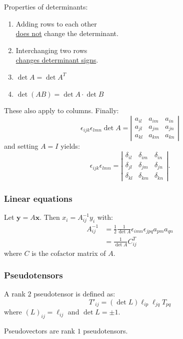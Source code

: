 \documentclass{article}
\begin{document}
\begin{multicols*}{3}
Properties of determinants:
\begin{enumerate}
    \item Adding rows to each other \\
    \underline{does not} change the determinant.
    
    \item Interchanging two rows \\
    \underline{changes determinant signs}.

    \item $\det A=\det A^T$
    
    \item $\det(AB)=\det A\cdot\det B$
\end{enumerate}
These also apply to columns. Finally:
$$\epsilon_{ijk}\epsilon_{lmn}\det A
=\left|
    \begin{array}{lll}
        a_{il} & a_{im} & a_{in} \\
        a_{jl} & a_{jm} & a_{jn} \\
        a_{kl} & a_{km} & a_{kn}
    \end{array}
\right|$$
and setting $A=I$ yields:
$$\epsilon_{ijk}\epsilon_{lmn}
=\left|
    \begin{array}{lll}
        \delta_{il} & \delta_{im} & \delta_{in} \\
        \delta_{jl} & \delta_{jm} & \delta_{jn} \\
        \delta_{kl} & \delta_{km} & \delta_{kn}
    \end{array}
\right|.$$

\subsubsection*{Linear equations}
Let $\boldsymbol{y}=A\boldsymbol{x}$.
Then $x_i=A^{-1}_{ij}y_i$ with:
\begin{align*}
    A^{-1}_{ij}&=\frac{1}{2}\frac{1}{\det A}
    \epsilon_{imn}\epsilon_{jpq}a_{pm}a_{qn} \\
    &=\frac{1}{\det A}C_{ij}^T
\end{align*}
where $C$ is the cofactor matrix of $A$.

\subsubsection*{Pseudotensors}
A rank $2$ pseudotensor is defined as:
$$T'_{ij}=(\det L)\ell_{ip}\ell_{jq}T_{pq}$$
where $(L)_{ij}=\ell_{ij}$
and $\det L=\pm1$.

Pseudovectors are rank $1$ pseudotensors.


\end{multicols*}
\end{document}
